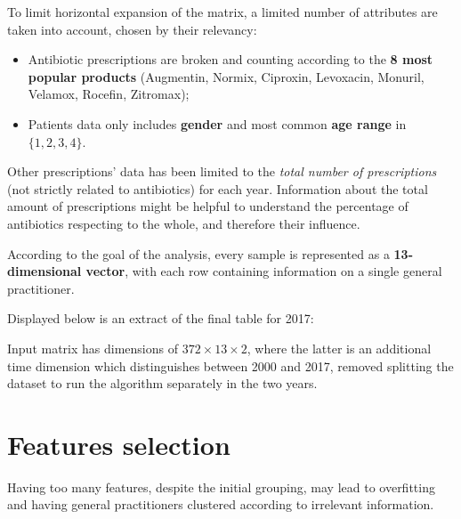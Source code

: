 To limit horizontal expansion of the matrix, a limited number of attributes are taken into account, chosen by their relevancy:
\begin{itemize}
	\item Antibiotic prescriptions are broken and counting according to the \textbf{8 most popular products} (Augmentin, Normix, Ciproxin, Levoxacin, Monuril, Velamox, Rocefin, Zitromax);
	\item Patients data only includes \textbf{gender} and most common \textbf{age range} in $\{1, 2, 3, 4\}$. 
\end{itemize}

Other prescriptions' data has been limited to the \textit{total number of prescriptions} (not strictly related to antibiotics) for each year. Information about the total amount of prescriptions might be helpful to understand the percentage of antibiotics respecting to the whole, and therefore their influence.

According to the goal of the analysis, every sample is represented as a \textbf{13-dimensional vector}, with each row containing information on a single general practitioner.

Displayed below is an extract of the final table for 2017:
\begin{center}
	\begin{table}[h]
\caption{\small $k$-means matrix extract}
\vspace{-20px}
\end{table}
\end{center}

Input matrix has dimensions of $372 \times 13 \times 2$, where the latter is an additional time dimension which distinguishes between 2000 and 2017, removed splitting the dataset to run the algorithm separately in the two years.

\section{Features selection}
Having too many features, despite the initial grouping, may lead to overfitting and having general practitioners clustered according to irrelevant information.


